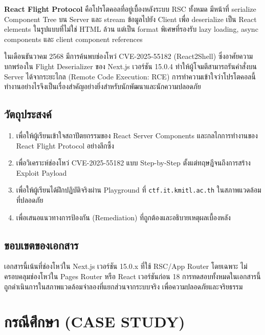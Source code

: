 \documentclass[12pt,oneside]{report}
\begin{document}
\textbf{React Flight Protocol} คือโปรโตคอลที่อยู่เบื้องหลังระบบ RSC ทั้งหมด มีหน้าที่ serialize Component Tree บน Server และ stream ข้อมูลไปยัง Client เพื่อ deserialize เป็น React elements ในรูปแบบที่ไม่ใช่ HTML ล้วน แต่เป็น format พิเศษที่รองรับ lazy loading, async components และ client component references

ในเดือนธันวาคม 2568 มีการค้นพบช่องโหว่ CVE-2025-55182 (React2Shell) ซึ่งอาศัยความบกพร่องใน Flight Deserializer ของ Next.js เวอร์ชัน 15.0.4 ทำให้ผู้โจมตีสามารถรันคำสั่งบน Server ได้จากระยะไกล (Remote Code Execution: RCE) การทำความเข้าใจว่าโปรโตคอลนี้ทำงานอย่างไรจึงเป็นเรื่องสำคัญอย่างยิ่งสำหรับนักพัฒนาและนักความปลอดภัย

\newpage

\section{วัตถุประสงค์}
\begin{enumerate}
    \item เพื่อให้ผู้เรียนเข้าใจสถาปัตยกรรมของ React Server Components และกลไกการทำงานของ React Flight Protocol อย่างลึกซึ้ง
    \item เพื่อวิเคราะห์ช่องโหว่ CVE-2025-55182 แบบ Step-by-Step ตั้งแต่ทฤษฎีจนถึงการสร้าง Exploit Payload
    \item เพื่อให้ผู้เรียนได้ฝึกปฏิบัติจริงผ่าน Playground ที่ \texttt{ctf.it.kmitl.ac.th} ในสภาพแวดล้อมที่ปลอดภัย
    \item เพื่อเสนอแนวทางการป้องกัน (Remediation) ที่ถูกต้องและอธิบายเหตุผลเบื้องหลัง
\end{enumerate}

\newpage

\section{ขอบเขตของเอกสาร}

เอกสารนี้เน้นที่ช่องโหว่ใน Next.js เวอร์ชัน 15.0.x ที่ใช้ RSC/App Router โดยเฉพาะ ไม่ครอบคลุมช่องโหว่ใน Pages Router หรือ React เวอร์ชันก่อน 18 การทดสอบทั้งหมดในเอกสารนี้ถูกดำเนินการในสภาพแวดล้อมจำลองที่แยกส่วนจากระบบจริง เพื่อความปลอดภัยและจริยธรรม

\chapter{กรณีศึกษา (CASE STUDY)}
\end{document}
